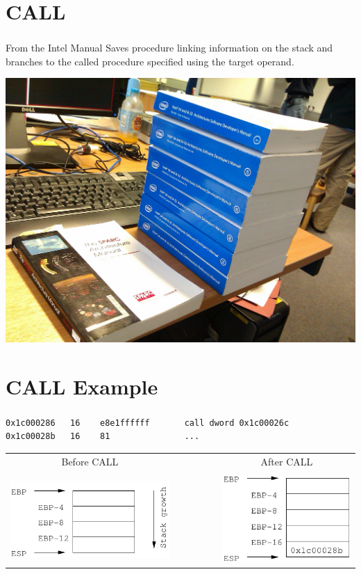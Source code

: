 \documentclass{beamer}
\begin{document}
\section{CALL}
\begin{frame}
  \frametitle{\insertsection}

  \begin{block}{From the Intel Manual}
    Saves procedure linking information on the stack and branches to the called
procedure specified using the target operand.
  \end{block}

  \vfill

  \begin{center}
  \includegraphics[width=.5\textwidth]{manual.jpg}
  \end{center}

\end{frame}


\section{CALL Example}
\begin{frame}[fragile]
  \frametitle{\insertsection}

\begin{lstlisting}[basicstyle=\footnotesize\tt]
0x1c000286   16    e8e1ffffff       call dword 0x1c00026c
0x1c00028b   16    81               ...
\end{lstlisting}

\vfill

\begin{tabular}{ccc}
Before CALL&&After CALL\\
\\
\includegraphics[width=.44\textwidth]{stack1.pdf}&
~~~~~~~&
\includegraphics[width=.37\textwidth]{stack2.pdf}\\
\end{tabular}
\end{frame}
\end{document}
